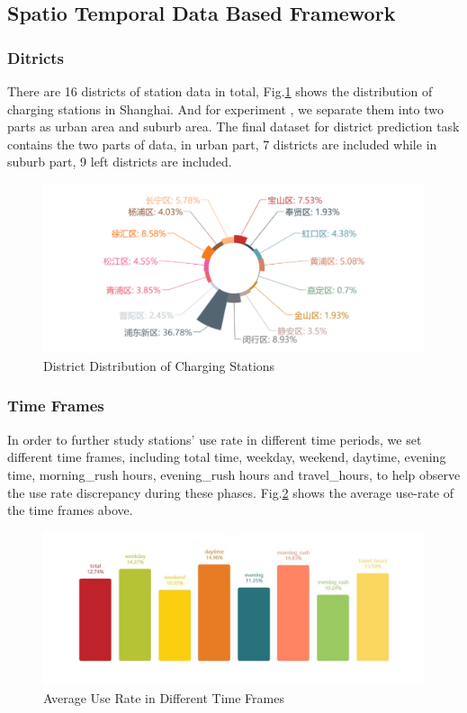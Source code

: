 \subsection{Spatio Temporal Data Based Framework}

\subsubsection{Ditricts}
There are 16 districts of station data in total, Fig.\ref{fig6} shows the distribution of charging stations in Shanghai. And for experiment , we separate them into two parts as urban area and suburb area. The final dataset for district prediction task contains the two parts of data, in urban part, 7 districts are included while in suburb part, 9 left districts are included.
\begin{figure}[!htp]
	\includegraphics[width=\columnwidth]{./figures/distribution.pdf}
	\centering
	\caption{District Distribution of Charging Stations}
	\label{fig6}
\end{figure}
\subsubsection{Time Frames}
In order to further study stations' use rate in different time periods, we set different time frames, including total time, weekday, weekend, daytime, evening time, morning\_rush hours, evening\_rush hours and travel\_hours, to help observe the use rate discrepancy during these phases. Fig.\ref{fig7} shows the average use-rate of the time frames above.
\begin{figure}[!htp]
	\includegraphics[width=\columnwidth]{./figures/timeframes.pdf}
	\centering
	\caption{Average Use Rate in Different Time Frames}
	\label{fig7}
\end{figure}

